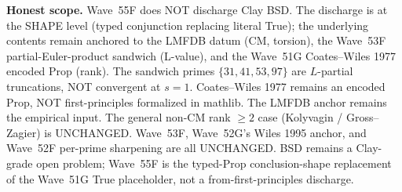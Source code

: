 \begin{remark}
\textbf{Honest scope.} Wave~55F does NOT discharge Clay BSD. The discharge is at the SHAPE level (typed conjunction replacing literal True); the underlying contents remain anchored to the LMFDB datum (CM, torsion), the Wave~53F partial-Euler-product sandwich (L-value), and the Wave~51G Coates--Wiles 1977 encoded Prop (rank). The sandwich primes $\{31, 41, 53, 97\}$ are $L$-partial truncations, NOT convergent at $s = 1$. Coates--Wiles 1977 remains an encoded Prop, NOT first-principles formalized in mathlib. The LMFDB anchor remains the empirical input. The general non-CM rank $\geq 2$ case (Kolyvagin / Gross--Zagier) is UNCHANGED. Wave~53F, Wave~52G's Wiles 1995 anchor, and Wave~52F per-prime sharpening are all UNCHANGED. BSD remains a Clay-grade open problem; Wave~55F is the typed-Prop conclusion-shape replacement of the Wave~51G True placeholder, not a from-first-principles discharge.
\end{remark}

